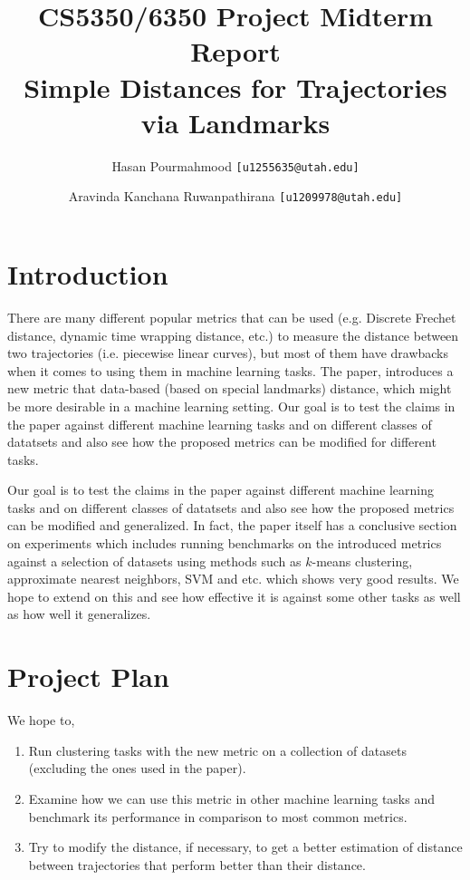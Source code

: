 \documentclass[11pt,a4paper,twocolumn]{article}%
\title{CS5350/6350 Project Midterm Report \\
 \large Simple Distances for Trajectories via Landmarks \citep{phillips2018simple}}
\author{Hasan Pourmahmood \texttt{[u1255635@utah.edu]} 
\and
Aravinda Kanchana Ruwanpathirana
\texttt{[u1209978@utah.edu]} 
}
\date{}
\begin{document}
\maketitle

\section{Introduction} 

There are many different popular metrics that can be used (e.g. Discrete Frechet distance, dynamic time wrapping distance, etc.) to measure the distance between two trajectories (i.e. piecewise linear curves), but most of them have drawbacks when it comes to using them in machine learning tasks. The paper, \citep{phillips2018simple} introduces a new metric that data-based (based on special landmarks) distance, which might be more desirable in a machine learning setting. Our goal is to test the claims in the paper against different machine learning tasks and on different classes of datatsets and also see how the proposed metrics can be modified for different tasks. 

\iffalse
Our goal is to test the claims in the paper against different machine learning tasks and on different classes of datatsets and also see how the proposed metrics can be modified and generalized. In fact, the paper itself has a conclusive section on experiments which includes running benchmarks on the introduced  metrics against a selection of datasets using methods such as $k$-means clustering, approximate nearest neighbors, SVM and etc. which shows very good results. We hope to extend on this and see how effective it is against some other tasks as well as how well it generalizes.

\section{Project Plan}
We hope to,
\begin{enumerate}
\itemsep0em
\item Run clustering tasks with the new metric on a collection of datasets (excluding the ones used in the paper).  
\item Examine how we can use this metric in other machine learning tasks and benchmark its performance in comparison to most common metrics. 
\item Try to modify the distance, if necessary, to get a better estimation of distance between trajectories that perform better than their distance. 
\iffalse
(Remove this one or the next one. What is your opinion?)
\item Try to generalize the distance to a larger class of curves such as piecewise smooth ones. 
\fi
\end{enumerate}
\end{document}
